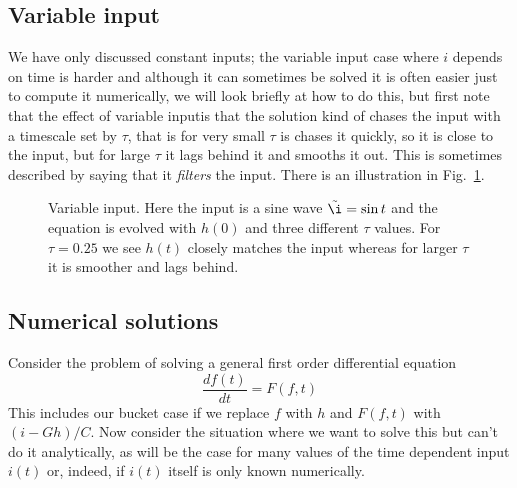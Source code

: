\documentclass[11pt,a4paper]{scrartcl}
\begin{document}
\subsection*{Variable input}

We have only discussed constant inputs; the variable input case where
$i$ depends on time is harder and although it can sometimes be solved
it is often easier just to compute it numerically, we will look
briefly at how to do this, but first note that the effect of variable
inputis that the solution kind of chases the input with a timescale
set by $\tau$, that is for very small $\tau$ is chases it quickly, so
it is close to the input, but for large $\tau$ it lags behind it and
smooths it out. This is sometimes described by saying that it
\textsl{filters} the input. There is an illustration in
Fig.~\ref{chasing}.

\begin{figure}
\begin{center}

\end{center}
\caption{Variable input. Here the input is a sine wave $\tilde{\i}=\sin{t}$ and the equation is evolved with $h(0)$ and three different $\tau$ values. For $\tau=0.25$ we see $h(t)$ closely matches the input whereas for larger $\tau$ it is smoother and lags behind.\label{chasing}}
\end{figure}

\subsection*{Numerical solutions}

Consider the problem of solving a general first order differential equation
\begin{equation}
\frac{df(t)}{dt}=F(f,t)
\end{equation}
This includes our bucket case if we replace $f$ with $h$ and $F(f,t)$
with $(i-Gh)/C$. Now consider the situation where we want to solve
this but can't do it analytically, as will be the case for many
values of the time dependent input $i(t)$ or, indeed, if $i(t)$ itself
is only known numerically. 
\end{document}
